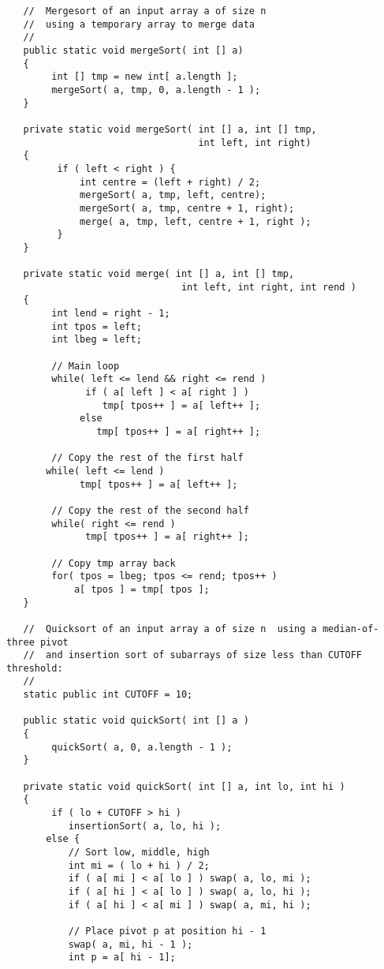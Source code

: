 {\begin{verbatim}
   //  Mergesort of an input array a of size n
   //  using a temporary array to merge data
   //
   public static void mergeSort( int [] a) 
   { 
        int [] tmp = new int[ a.length ]; 
        mergeSort( a, tmp, 0, a.length - 1 ); 
   } 
 
   private static void mergeSort( int [] a, int [] tmp, 
                                  int left, int right) 
   { 
         if ( left < right ) { 
             int centre = (left + right) / 2; 
             mergeSort( a, tmp, left, centre); 
             mergeSort( a, tmp, centre + 1, right); 
             merge( a, tmp, left, centre + 1, right ); 
         } 
   } 
 
   private static void merge( int [] a, int [] tmp, 
                               int left, int right, int rend ) 
   { 
        int lend = right - 1; 
        int tpos = left; 
        int lbeg = left; 
     
        // Main loop 
        while( left <= lend && right <= rend ) 
              if ( a[ left ] < a[ right ] )
                 tmp[ tpos++ ] = a[ left++ ]; 
             else 
                tmp[ tpos++ ] = a[ right++ ]; 
 
        // Copy the rest of the first half 
       while( left <= lend ) 
             tmp[ tpos++ ] = a[ left++ ];
 
        // Copy the rest of the second half 
        while( right <= rend ) 
              tmp[ tpos++ ] = a[ right++ ]; 
 
        // Copy tmp array back 
        for( tpos = lbeg; tpos <= rend; tpos++ ) 
            a[ tpos ] = tmp[ tpos ]; 
   } 
 
   //  Quicksort of an input array a of size n  using a median-of-three pivot 
   //  and insertion sort of subarrays of size less than CUTOFF threshold:
   // 
   static public int CUTOFF = 10; 

   public static void quickSort( int [] a ) 
   { 
        quickSort( a, 0, a.length - 1 ); 
   } 

   private static void quickSort( int [] a, int lo, int hi ) 
   { 
        if ( lo + CUTOFF > hi ) 
           insertionSort( a, lo, hi ); 
       else { 
           // Sort low, middle, high 
           int mi = ( lo + hi ) / 2; 
           if ( a[ mi ] < a[ lo ] ) swap( a, lo, mi ); 
           if ( a[ hi ] < a[ lo ] ) swap( a, lo, hi ); 
           if ( a[ hi ] < a[ mi ] ) swap( a, mi, hi ); 
 
           // Place pivot p at position hi - 1 
           swap( a, mi, hi - 1 ); 
           int p = a[ hi - 1]; 
 

\end{verbatim}}
